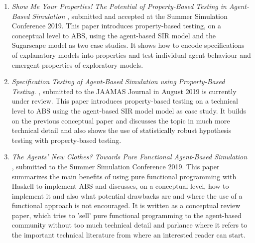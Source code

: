 \begin{enumerate}
	\item \textit{Show Me Your Properties! The Potential of Property-Based Testing in Agent-Based Simulation} \cite{thaler_show_2019}, submitted and accepted at the Summer Simulation Conference 2019. This paper introduces property-based testing, on a conceptual level to ABS, using the agent-based SIR model and the Sugarscape model as two case studies. It shows how to encode specifications of explanatory models into properties and test individual agent behaviour and emergent properties of exploratory models.

	\item \textit{Specification Testing of Agent-Based Simulation using Property-Based Testing.} \cite{thaler_specification_2019}, submitted to the JAAMAS Journal in August 2019 is currently under review.
This paper introduces property-based testing on a technical level to ABS using the agent-based SIR model model as case study. It builds on the previous conceptual paper and discusses the topic in much more technical detail and also shows the use of statistically robust hypothesis testing with property-based testing.
	
	\item \textit{The Agents' New Clothes? Towards Pure Functional Agent-Based Simulation} \cite{thaler_agents_2019}, submitted to the Summer Simulation Conference 2019. This paper summarizes the main benefits of using pure functional programming with Haskell to implement ABS and discusses, on a conceptual level, how to implement it and also what potential drawbacks are and where the use of a functional approach is not encouraged. It is written as a conceptual review paper, which tries to 'sell' pure functional programming to the agent-based community without too much technical detail and parlance where it refers to the important technical literature from where an interested reader can start.
\end{enumerate}